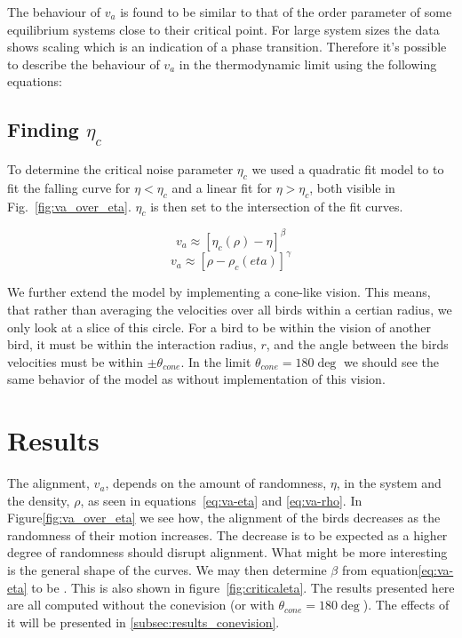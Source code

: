 \documentclass[twoside,twocolumn]{article}
\begin{document}
The behaviour of $v_a$ is found to be similar to that of the order parameter of some equilibrium systems close to their critical point. For large system sizes the data shows scaling which is an indication of a phase transition. Therefore it's possible to describe the behaviour of $v_a$ in the thermodynamic limit using the following equations:




\subsection{Finding $\eta_c$}
To determine the critical noise parameter $\eta_c$ we used a quadratic fit model
to to fit the falling curve for $\eta < \eta_c$ and a linear fit for $\eta > 
\eta_c$, both visible in Fig.~\ref{fig:va_over_eta}. $\eta_c$ is then set to 
the intersection of the fit curves. 





\begin{equation}
  \label{eq:va-eta}
  v_a \approx[\eta_c(\rho)-\eta]^\beta 
\end{equation}
\begin{equation}
  \label{eq:va-rho}
  v_a \approx[\rho-\rho_c(eta)]^\gamma
\end{equation}

We further extend the model by implementing a cone-like vision. This means, that rather than averaging the velocities over all birds within a certian radius, we only look at a slice of this circle. For a bird to be within the vision of another bird, it must be within the interaction radius, $r$, and the angle between the birds velocities must be within $\pm \theta_{cone}$. In the limit $\theta_{cone} = 180 \deg$ we should see the same behavior of the model as without implementation of this vision.

\section{Results}

The alignment, $v_a$, depends on the amount of randomness, $\eta$, in the system and the density, $\rho$, as seen in equations~\eqref{eq:va-eta} and \eqref{eq:va-rho}. In Figure\ref{fig:va_over_eta} we see how, the alignment of the birds decreases as the randomness of their motion increases. The decrease is to be expected as a higher degree of randomness should disrupt alignment. What might be more interesting is the general shape of the curves. We may then determine $\beta$ from equation\eqref{eq:va-eta} to be  . This is also shown in figure~\ref{fig:criticaleta}. The results presented here are all computed without the conevision (or with $\theta_{cone} = 180\deg$). The effects of it will be presented in \ref{subsec:results_conevision}.
\end{document}

